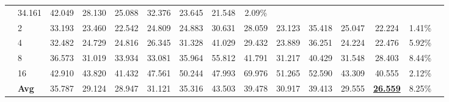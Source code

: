 \begin{table*}[t]
{\begin{tabular}{llccccccccccccc}
            & 34.161 & 42.049 & 28.130 & 25.088 
            & 32.376 & 23.645 & \cellcolor{low1}21.548
            & 2.09\% \\[2pt]
          & 2  
            & 33.193 & 23.460 & \cellcolor{low2}22.542 & 24.809 
            & 24.883 & 30.631 & 28.059 & \cellcolor{low3}23.123 
            & 35.418 & 25.047 & \cellcolor{low1}22.224
            & 1.41\% \\[2pt]
          & 4  
            & 32.482 & 24.729 & 24.816 & 26.345 
            & 31.328 & 41.029 & 29.432 & \cellcolor{low2}23.889 
            & 36.251 & \cellcolor{low3}24.224 & \cellcolor{low1}22.476
            & 5.92\% \\[2pt]
          & 8  
            & 36.573 & \cellcolor{low2}31.019 & 33.934 & 33.081 
            & 35.964 & 55.812 & 41.791 & \cellcolor{low3}31.217 
            & 40.429 & 31.548 & \cellcolor{low1}28.403
            & 8.44\% \\[2pt]
          & 16 
            & \cellcolor{low3}42.910 & 43.820 & \cellcolor{low2}41.432 & 47.561 
            & 50.244 & 47.993 & 69.976 & 51.265 
            & 52.590 & 43.309 & \cellcolor{low1}40.555
            & 2.12\% \\[2pt]
          & \textbf{Avg} 
            & 35.787 & \cellcolor{low3}29.124 & \cellcolor{low2}28.947 & 31.121 
            & 35.316 & 43.503 & 39.478 & 30.917 
            & 39.413 & 29.555 & \cellcolor{low1}\textbf{\underline{26.559}}
            & 8.25\% \\
        \bottomrule
    \end{tabular}
    }
\end{table*}


